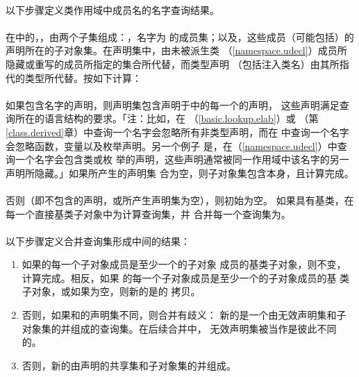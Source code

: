 \paragraph{}
以下步骤定义类作用域中成员名的名字查询结果。

\paragraph{}
在中的，，由两个子集组成：，名字为
的成员集；以及，这些成员（可能包括）的
声明所在的子对象集。在声明集中，由未被派生类
（\ref{namespace.udecl}）成员所隐藏或重写的成员所指定的集合所代替，而类型声明
（包括注入类名）由其所指代的类型所代替。按如下计算：

\paragraph{}
如果包含名字的声明，则声明集包含声明于中的每一个的声明，
这些声明满足查询所在的语言结构的要求。「注：比如，在
（\ref{basic.lookup.elab}）或
（第\ref{class.derived}章）中查询一个名字会忽略所有非类型声明，而在
中查询一个名字会忽略函数，变量以及枚举声明。另一个例子
是，在（\ref{namespace.udecl}）中查询一个名字会包含类或枚
举的声明，这些声明通常被同一作用域中该名字的另一声明所隐藏。」如果所产生的声明集
合为空，则子对象集包含本身，且计算完成。

\paragraph{}
否则（即不包含的声明，或所产生声明集为空），则初始为空。
如果具有基类，在每一个直接基类子对象中为计算查询集，并
合并每一个查询集为。

\paragraph{}
以下步骤定义合并查询集形成中间的结果：
\begin{enumerate}
  \item{如果的每一个子对象成员是至少一个的子对象
    成员的基类子对象，则不变，计算完成。相反，如果
    的每一个子对象成员是至少一个的子对象成员的基
    类子对象，或如果为空，则新的是的
    拷贝。}
  \item{否则，如果和的声明集不同，则合并有歧义：
    新的是一个由无效声明集和子对象集的并组成的查询集。在后续合并中，
    无效声明集被当作是彼此不同的。}
  \item{否则，新的由声明的共享集和子对象集的并组成。}
\end{enumerate}

